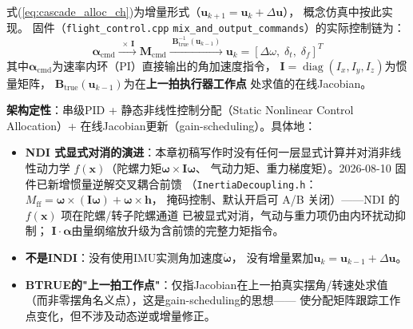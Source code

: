 \begin{remark}
\label{rem:firmware_alloc}
式(\ref{eq:cascade_alloc_ch})为增量形式（$\mathbf{u}_{k+1}=\mathbf{u}_k+\Delta\mathbf{u}$），
概念仿真中按此实现。
固件（\texttt{flight\_control.cpp} \texttt{mix\_and\_output\_commands}）的实际控制链为：
\begin{equation}
    \boldsymbol{\alpha}_{\mathrm{cmd}} \xrightarrow{\;\times\,\mathbf{I}\;}
    \mathbf{M}_{\mathrm{cmd}} \xrightarrow{\;\mathbf{B}_{\mathrm{true}}^{-1}(\mathbf{u}_{k-1})\;}
    \mathbf{u}_k = [\Delta\omega,\;\delta_t,\;\delta_f]^T
    \label{eq:cascade_alloc_firmware}
\end{equation}
其中$\boldsymbol{\alpha}_{\mathrm{cmd}}$为速率内环（PI）直接输出的角加速度指令，
$\mathbf{I}=\operatorname{diag}(I_x,I_y,I_z)$为惯量矩阵，
$\mathbf{B}_{\mathrm{true}}(\mathbf{u}_{k-1})$为在\textbf{上一拍执行器工作点}
处求值的在线Jacobian。

\textbf{架构定性}：串级PID + 静态非线性控制分配（Static Nonlinear Control
Allocation）+ 在线Jacobian更新（gain-scheduling）。具体地：
\begin{itemize}
    \item \textbf{NDI 式显式对消的演进}：本章初稿写作时没有任何一层显式计算并对消非线性动力学
          $f(\mathbf{x})$（陀螺力矩$\boldsymbol{\omega}\times\mathbf{I}\boldsymbol{\omega}$、
          气动力矩、重力梯度矩）。2026-08-10 固件已新增惯量逆解交叉耦合前馈
          （\texttt{InertiaDecoupling.h}：$M_{\mathrm{ff}}=\boldsymbol{\omega}\times(\mathbf{I}\boldsymbol{\omega})+\boldsymbol{\omega}\times\mathbf{h}$，
          掩码控制、默认开启可 A/B 关闭）——NDI 的 $f(\mathbf{x})$ 项在陀螺/转子陀螺通道
          已被显式对消，气动与重力项仍由内环扰动抑制；
          $\mathbf{I}\cdot\boldsymbol{\alpha}$由量纲缩放升级为含前馈的完整力矩指令。
    \item \textbf{不是INDI}：没有使用IMU实测角加速度$\dot{\boldsymbol{\omega}}$，
          没有增量累加$\mathbf{u}_k=\mathbf{u}_{k-1}+\Delta\mathbf{u}$。
    \item \textbf{BTRUE的"上一拍工作点"}：仅指Jacobian在上一拍真实摆角/转速处求值
          （而非零摆角名义点），这是gain-scheduling的思想——
          使分配矩阵跟踪工作点变化，但不涉及动态逆或增量修正。
\end{itemize}


\end{remark}
